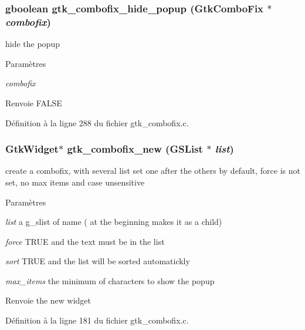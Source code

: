 \subsubsection[{gtk\_\-combofix\_\-hide\_\-popup}]{\setlength{\rightskip}{0pt plus 5cm}gboolean gtk\_\-combofix\_\-hide\_\-popup ({\bf GtkComboFix} $\ast$ {\em combofix})}\label{gtk__combofix_8h_a37b13db2ce7129dcca712862f118d531}
hide the popup


\begin{DoxyParams}{Paramètres}
\item[{\em combofix}]\end{DoxyParams}
\begin{DoxyReturn}{Renvoie}
FALSE 
\end{DoxyReturn}


Définition à la ligne 288 du fichier gtk\_\-combofix.c.

\subsubsection[{gtk\_\-combofix\_\-new}]{\setlength{\rightskip}{0pt plus 5cm}GtkWidget$\ast$ gtk\_\-combofix\_\-new (GSList $\ast$ {\em list})}\label{gtk__combofix_8h_a7642341a194730bea49a96c515349870}
create a combofix, with several list set one after the others by default, force is not set, no max items and case unsensitive


\begin{DoxyParams}{Paramètres}
\item[{\em list}]a g\_\-slist of name ( at the beginning makes it as a child) \item[{\em force}]TRUE and the text must be in the list \item[{\em sort}]TRUE and the list will be sorted automatickly \item[{\em max\_\-items}]the minimum of characters to show the popup\end{DoxyParams}
\begin{DoxyReturn}{Renvoie}
the new widget 
\end{DoxyReturn}


Définition à la ligne 181 du fichier gtk\_\-combofix.c.

